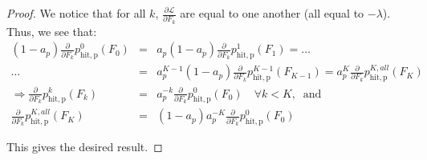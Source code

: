 \begin{proof}
\noindent We notice that for all $k$, $\frac{\partial \mathcal{L}}{\partial F_k}$ are equal to one another (all equal to $-\lambda$). Thus, we see that:
\begin{eqnarray*}
(1-a_p)\frac{\partial }{\partial F_k} p_{\mathrm{hit,p}}^0(F_0) &=& a_p(1-a_p)\frac{\partial }{\partial F_k} p_{\mathrm{hit,p}}^1(F_1) = \ldots \\
\ldots &=&  a_p^{K-1}(1-a_p)\frac{\partial }{\partial F_k} p_{\mathrm{hit,p}}^{K-1}(F_{K-1}) = a_p^K \frac{\partial }{\partial F_k} p_{\mathrm{hit,p}}^{K,all}(F_K) \\
\Rightarrow \frac{\partial }{\partial F_k} p_{\mathrm{hit,p}}^k(F_k) &=& a_p^{-k}\frac{\partial }{\partial F_k} p_{\mathrm{hit,p}}^0(F_0) \quad \forall k < K, \;\; \text{and} \\
\frac{\partial }{\partial F_k} p_{\mathrm{hit,p}}^{K,all}(F_K) &=& (1-a_p) a_p^{-K}\frac{\partial }{\partial F_k} p_{\mathrm{hit,p}}^0(F_0)
\end{eqnarray*}

This gives the desired result.




\end{proof}

